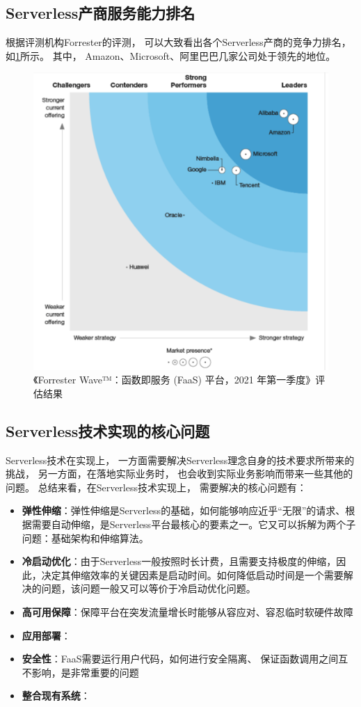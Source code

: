 \subsection{Serverless产商服务能力排名}
根据评测机构Forrester的评测，
可以大致看出各个Serverless产商的竞争力排名，
如\cref{faas_2021_q1_ranking}所示。
其中，
Amazon、Microsoft、阿里巴巴几家公司处于领先的地位。

\begin{figure}[ht!]
    \centering
    \includegraphics[width=0.7\linewidth]{images/faas-2021-q1.png}
    \caption{《Forrester Wave™：函数即服务 (FaaS) 平台，2021 年第一季度》评估结果\cite{serverless_report_2021}}
    \label{faas_2021_q1_ranking}
\end{figure}

\subsection{Serverless技术实现的核心问题}

Serverless技术在实现上，
一方面需要解决Serverless理念自身的技术要求所带来的挑战，
另一方面，在落地实际业务时，
也会收到实际业务影响而带来一些其他的问题。
总结来看，在Serverless技术实现上，
需要解决的核心问题有：

\begin{itemize}
    \item \textbf{弹性伸缩}：弹性伸缩是Serverless的基础，如何能够响应近乎“无限”的请求、根据需要自动伸缩，是Serverless平台最核心的要素之一。它又可以拆解为两个子问题：基础架构和伸缩算法。
    \item \textbf{冷启动优化}：由于Serverless一般按照时长计费，且需要支持极度的伸缩，因此，决定其伸缩效率的关键因素是启动时间。如何降低启动时间是一个需要解决的问题，该问题一般又可以等价于冷启动优化问题。
    \item \textbf{高可用保障}：保障平台在突发流量增长时能够从容应对、容忍临时软硬件故障
    \item \textbf{应用部署}：
    \item \textbf{安全性}：FaaS需要运行用户代码，如何进行安全隔离、
        保证函数调用之间互不影响，是非常重要的问题
    \item \textbf{整合现有系统}：
\end{itemize}

